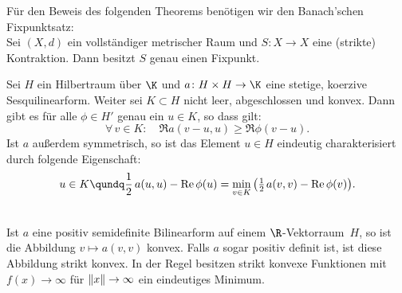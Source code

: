 Für den Beweis des folgenden Theorems benötigen wir den Banach'schen
Fixpunktsatz:\\
\nnSatz Sei $(X,d)$ ein vollständiger metrischer Raum und $S\colon X\to X$ eine
(strikte) Kontraktion. Dann besitzt $S$ genau einen Fixpunkt.

\begin{thTheorem}[Stampacchia] \label{vl13:stampacchia}
    Sei $H$ ein Hilbertraum über $\K$ und $a\colon H\times H\to\K$ eine
    stetige, koerzive Sesquilinearform. Weiter sei $K\subset H$ nicht leer,
    abgeschlossen und konvex. Dann gibt es für alle $\phi\in H'$ genau ein
    $u\in K$, so dass gilt:
    \[ \tag{$\star$} \label{vl13:star}
        \forall\,v\in K\colon\quad \Re a(v-u,u) \geq \Re\phi(v-u)  
    . \]
    Ist $a$ außerdem symmetrisch, so ist das Element $u\in H$ eindeutig
    charakterisiert durch folgende Eigenschaft:
    \[ u\in K \qundq \half\,a(u,u) - \Re\phi(u) 
        = \min_{v\in K} \, \bigl( \thalf\mkern2mu a(v,v) - \Re\phi(v) \bigr)
    . \]
\end{thTheorem}


\nnBemerkung\\
Ist $a$ eine positiv semidefinite Bilinearform auf einem $\R$-Vektorraum~$H$, so
ist die Abbildung $v\mapsto a(v,v)$ konvex. Falls $a$ sogar positiv definit ist,
ist diese Abbildung  strikt konvex. In der Regel besitzen strikt konvexe
Funktionen mit $f(x)\to\infty$ für $\lVert x\rVert\to\infty$ ein eindeutiges Minimum.
